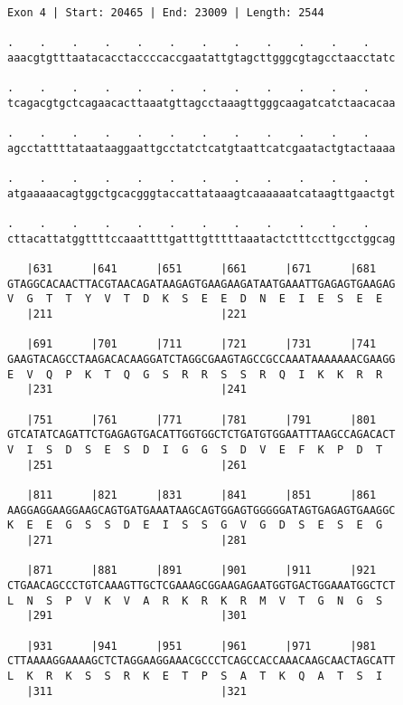\documentclass{article}
\begin{document}
\newpage
\begin{Verbatim}
Exon 4 | Start: 20465 | End: 23009 | Length: 2544
 
.    .    .    .    .    .    .    .    .    .    .    .    
aaacgtgtttaatacacctaccccaccgaatattgtagcttgggcgtagcctaacctatc
  
.    .    .    .    .    .    .    .    .    .    .    .    
tcagacgtgctcagaacacttaaatgttagcctaaagttgggcaagatcatctaacacaa
  
.    .    .    .    .    .    .    .    .    .    .    .    
agcctattttataataaggaattgcctatctcatgtaattcatcgaatactgtactaaaa
  
.    .    .    .    .    .    .    .    .    .    .    .    
atgaaaaacagtggctgcacgggtaccattataaagtcaaaaaatcataagttgaactgt
  
.    .    .    .    .    .    .    .    .    .    .    .    
cttacattatggttttccaaattttgatttgtttttaaatactctttccttgcctggcag
  
   |631      |641      |651      |661      |671      |681   
GTAGGCACAACTTACGTAACAGATAAGAGTGAAGAAGATAATGAAATTGAGAGTGAAGAG
V  G  T  T  Y  V  T  D  K  S  E  E  D  N  E  I  E  S  E  E  
   |211                          |221                       
  
   |691      |701      |711      |721      |731      |741   
GAAGTACAGCCTAAGACACAAGGATCTAGGCGAAGTAGCCGCCAAATAAAAAAACGAAGG
E  V  Q  P  K  T  Q  G  S  R  R  S  S  R  Q  I  K  K  R  R  
   |231                          |241                       
  
   |751      |761      |771      |781      |791      |801   
GTCATATCAGATTCTGAGAGTGACATTGGTGGCTCTGATGTGGAATTTAAGCCAGACACT
V  I  S  D  S  E  S  D  I  G  G  S  D  V  E  F  K  P  D  T  
   |251                          |261                       
  
   |811      |821      |831      |841      |851      |861   
AAGGAGGAAGGAAGCAGTGATGAAATAAGCAGTGGAGTGGGGGATAGTGAGAGTGAAGGC
K  E  E  G  S  S  D  E  I  S  S  G  V  G  D  S  E  S  E  G  
   |271                          |281                       
  
   |871      |881      |891      |901      |911      |921   
CTGAACAGCCCTGTCAAAGTTGCTCGAAAGCGGAAGAGAATGGTGACTGGAAATGGCTCT
L  N  S  P  V  K  V  A  R  K  R  K  R  M  V  T  G  N  G  S  
   |291                          |301                       
  
   |931      |941      |951      |961      |971      |981   
CTTAAAAGGAAAAGCTCTAGGAAGGAAACGCCCTCAGCCACCAAACAAGCAACTAGCATT
L  K  R  K  S  S  R  K  E  T  P  S  A  T  K  Q  A  T  S  I  
   |311                          |321                       
  

\end{Verbatim}
\end{document}
